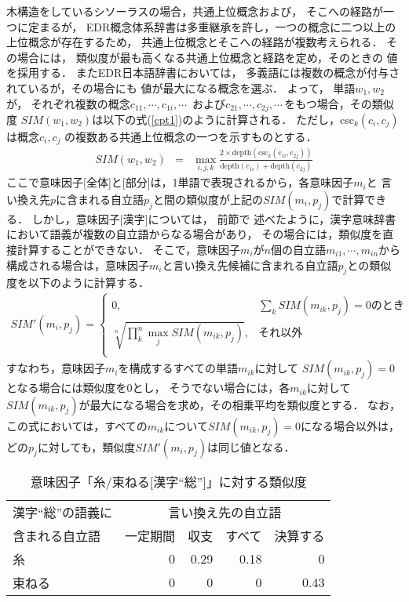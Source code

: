 木構造をしているシソーラスの場合，共通上位概念および，
そこへの経路が一つに定まるが，
EDR概念体系辞書は多重継承を許し，一つの概念に二つ以上の
上位概念が存在するため，
共通上位概念とそこへの経路が複数考えられる．
その場合には，
類似度が最も高くなる共通上位概念と経路を定め，そのときの
値を採用する．
またEDR日本語辞書においては，
多義語には複数の概念が付与されているが，その場合にも
値が最大になる概念を選ぶ．
よって，
単語$w_1,w_{2}$が，
それぞれ複数の概念$c_{11},\cdots,c_{1i},\cdots\,$
および$c_{21},\cdots,c_{2j},\cdots\,$をもつ場合，その類似度
$SIM(w_{1},w_{2})$は以下の式(\ref{cpt1})のように計算される．
ただし，csc$_k(c_i,c_j)$は概念$c_{i},c_{j}$ の複数ある共通上位概念の一つを示すものとする．
\begin{eqnarray}
 \label{cpt1}
  SIM(w_{1},w_{2}) & = & \max_{i,j,k}\frac{ 2\times \mbox{depth}(\mbox{csc}_k(c_{1i},c_{2j}))}{\mbox{depth}(c_{1i})+\mbox{depth}(c_{2j})}
\end{eqnarray}
ここで意味因子[全体]と[部分]は，1単語で表現されるから，各意味因子$m_i$と
言い換え先$p$に含まれる自立語$p_j$と間の類似度が上記の$SIM(m_i,p_j)$で計算できる．
しかし，意味因子[漢字]については，
前節で
述べたように，漢字意味辞書において語義が複数の自立語からなる場合があり，
その場合には，類似度を直接計算することができない．
そこで，意味因子$m_i$が$n$個の自立語$m_{i1},\cdots,m_{in}$から構成される場合は，意味因子$m_i$と言い換え先候補に含まれる自立語$p_j$との類似度を以下のように計算する．
\begin{eqnarray}
 \label{gm}
SIM'(m_i,p_j) = \left\{
\begin{array}{ll}
 0,& {\displaystyle\sum_{k}SIM(m_{ik},p_j) = 0}のとき\\
{\displaystyle\sqrt[n]{\prod_{k}^{n} \max_{j} SIM(m_{ik},p_{j})}}, & それ以外\\
\end{array}
\right.
\end{eqnarray}
すなわち，意味因子$m_i$を構成するすべての単語$m_{ik}$に対して
$SIM(m_{ik},p_j) = 0$となる場合には類似度を0とし，
そうでない場合には，各$m_{ik}$に対して$SIM(m_{ik},p_j)$が最大になる場合を求め，その相乗平均を類似度とする．
なお，この式においては，すべての$m_{ik}$について$SIM(m_{ik},p_j) = 0$になる場合以外は，どの$p_j$に対しても，類似度$SIM'(m_i,p_j)$は同じ値となる．

   \begin{table}[tb]
	\begin{center}
	 \caption{\label{itotaba}意味因子「糸/束ねる[漢字``総'']」に対する類似度}
	 \begin{tabular}{l|r|r|r|r} \hline
	  漢字``総''の語義に         & \multicolumn{4}{|c}{言い換え先の自立語} \\ \cline{2-5}
	  含まれる自立語                 & 一定期間 & 収支   & すべて & 決算する \\ \hline 
	  \multicolumn{1}{l|}{糸}   & 0        & 0.29 &  0.18  & 0        \\ 
	  束ねる & 0    &  0    & 0 & 0.43      \\ \hline
	 \end{tabular}
	\end{center}
   \end{table}

